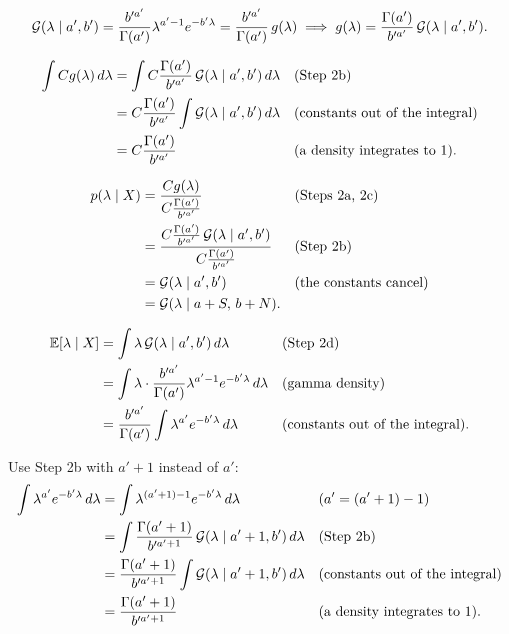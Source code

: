 \begin{solution}
\[
  \mathcal{G}(\lambda \mid a', b')
  = \frac{b'^{a'}}{\Gamma(a')} \lambda^{a' - 1} e^{-b'\lambda}
  = \frac{b'^{a'}}{\Gamma(a')} \, g(\lambda)
  \;\Longrightarrow\;
  g(\lambda) = \frac{\Gamma(a')}{b'^{a'}} \, \mathcal{G}(\lambda \mid a', b').
\]

\begin{align*}
  \int C g(\lambda) \, d\lambda
  &= \int C \frac{\Gamma(a')}{b'^{a'}} \, \mathcal{G}(\lambda \mid a', b') \, d\lambda
    && \text{(Step 2b)} \\
  &= C \frac{\Gamma(a')}{b'^{a'}} \int \mathcal{G}(\lambda \mid a', b') \, d\lambda
    && \text{(constants out of the integral)} \\
  &= C \frac{\Gamma(a')}{b'^{a'}}
    && \text{(a density integrates to 1)}.
\end{align*}

\begin{align*}
  p(\lambda \mid X)
  &= \frac{C g(\lambda)}{C \frac{\Gamma(a')}{b'^{a'}}}
    && \text{(Steps 2a, 2c)} \\
  &= \frac{C \frac{\Gamma(a')}{b'^{a'}} \, \mathcal{G}(\lambda \mid a', b')}
          {C \frac{\Gamma(a')}{b'^{a'}}}
    && \text{(Step 2b)} \\
  &= \mathcal{G}(\lambda \mid a', b')
    && \text{(the constants cancel)} \\
  &= \mathcal{G}(\lambda \mid a + S, \, b + N).
\end{align*}

\begin{align*}
  \mathbb{E}[\lambda \mid X]
  &= \int \lambda \, \mathcal{G}(\lambda \mid a', b') \, d\lambda
    && \text{(Step 2d)} \\
  &= \int \lambda \cdot \frac{b'^{a'}}{\Gamma(a')} \lambda^{a' - 1}
     e^{-b'\lambda} \, d\lambda
    && \text{(gamma density)} \\
  &= \frac{b'^{a'}}{\Gamma(a')} \int \lambda^{a'} e^{-b'\lambda} \, d\lambda
    && \text{(constants out of the integral)}.
\end{align*}

Use Step 2b with $a' + 1$ instead of $a'$:
\begin{align*}
  \int \lambda^{a'} e^{-b'\lambda} \, d\lambda
  &= \int \lambda^{(a' + 1) - 1} e^{-b'\lambda} \, d\lambda
    && \text{($a' = (a' + 1) - 1$)} \\
  &= \int \frac{\Gamma(a' + 1)}{b'^{a' + 1}} \,
     \mathcal{G}(\lambda \mid a' + 1, b') \, d\lambda
    && \text{(Step 2b)} \\
  &= \frac{\Gamma(a' + 1)}{b'^{a' + 1}}
     \int \mathcal{G}(\lambda \mid a' + 1, b') \, d\lambda
    && \text{(constants out of the integral)} \\
  &= \frac{\Gamma(a' + 1)}{b'^{a' + 1}}
    && \text{(a density integrates to 1)}.
\end{align*}


\end{solution}
